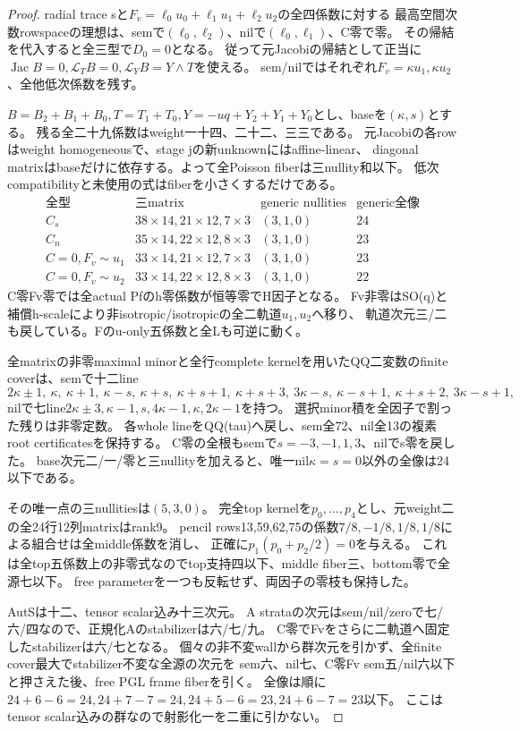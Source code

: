 \documentclass[a4paper,11pt]{ltjsarticle}
\theoremstyle{definition}
\begin{document}
\begin{proof}
radial trace sと$F_v=\ell_0u_0+\ell_1u_1+\ell_2u_2$の全四係数に対する
最高空間次数rowspaceの理想は、semで$(\ell_0,\ell_2)$、nilで$(\ell_0,\ell_1)$、C零で零。
その帰結を代入すると全三型で$D_0=0$となる。
従って元Jacobiの帰結として正当に
$\operatorname{Jac}B=0,\mathcal L_TB=0,\mathcal L_YB=Y\wedge T$を使える。
sem/nilではそれぞれ$F_v=\kappa u_1,\kappa u_2$、全他低次係数を残す。

$B=B_2+B_1+B_0,T=T_1+T_0,Y=-uq+Y_2+Y_1+Y_0$とし、baseを$(\kappa,s)$とする。
残る全二十九係数はweight一十四、二十二、三三である。
元Jacobiの各rowはweight homogeneousで、stage jの新unknownにはaffine-linear、
diagonal matrixはbaseだけに依存する。よって全Poisson fiberは三nullity和以下。
低次compatibilityと未使用の式はfiberを小さくするだけである。
\[
\begin{array}{c|c|c|c}
 \text{全型}&\text{三matrix}&\text{generic nullities}&\text{generic全像}\\\hline
 C_s&38\times14,21\times12,7\times3&(3,1,0)&24\\
 C_n&35\times14,22\times12,8\times3&(3,1,0)&23\\
 C=0,F_v\sim u_1&33\times14,21\times12,7\times3&(3,1,0)&23\\
 C=0,F_v\sim u_2&33\times14,22\times12,8\times3&(3,1,0)&22
\end{array}
\]
C零Fv零では全actual Pfのh零係数が恒等零でH因子となる。
Fv非零はSO(q)と補償h-scaleにより非isotropic/isotropicの全二軌道$u_1,u_2$へ移り、
軌道次元三/二も戻している。Fのu-only五係数と全Lも可逆に動く。

全matrixの非零maximal minorと全行complete kernelを用いたQQ二変数のfinite coverは、semで十二line
\[
 2\kappa\pm1,\ \kappa,\ \kappa+1,\ \kappa-s,\ \kappa+s,\
 \kappa+s+1,\ \kappa+s+3,\ 3\kappa-s,\ \kappa-s+1,\ \kappa+s+2,\ 3\kappa-s+1,
\]
nilで七line$2\kappa\pm3,\kappa-1,s,4\kappa-1,\kappa,2\kappa-1$を持つ。
選択minor積を全因子で割った残りは非零定数。
各whole lineをQQ(tau)へ戻し、sem全72、nil全13の複素root certificatesを保持する。
C零の全根もsemで$s=-3,-1,1,3$、nilでs零を戻した。
base次元二/一/零と三nullityを加えると、唯一nil$\kappa=s=0$以外の全像は24以下である。

その唯一点の三nullitiesは$(5,3,0)$。
完全top kernelを$p_0,\ldots,p_4$とし、元weight二の全24行12列matrixはrank9。
pencil rows13,59,62,75の係数$7/8,-1/8,1/8,1/8$による組合せは全middle係数を消し、
正確に$p_1(p_0+p_2/2)=0$を与える。
これは全top五係数上の非零式なのでtop支持四以下、middle fiber三、bottom零で全源七以下。
free parameterを一つも反転せず、両因子の零枝も保持した。

AutSは十二、tensor scalar込み十三次元。
A strataの次元はsem/nil/zeroで七/六/四なので、正規化Aのstabilizerは六/七/九。
C零でFvをさらに二軌道へ固定したstabilizerは六/七となる。
個々の非不変wallから群次元を引かず、全finite cover最大でstabilizer不変な全源の次元を
sem六、nil七、C零Fv sem五/nil六以下と押さえた後、free PGL frame fiberを引く。
全像は順に$24+6-6=24,24+7-7=24,24+5-6=23,24+6-7=23$以下。
ここはtensor scalar込みの群なので射影化一を二重に引かない。
\end{proof}
\end{document}
